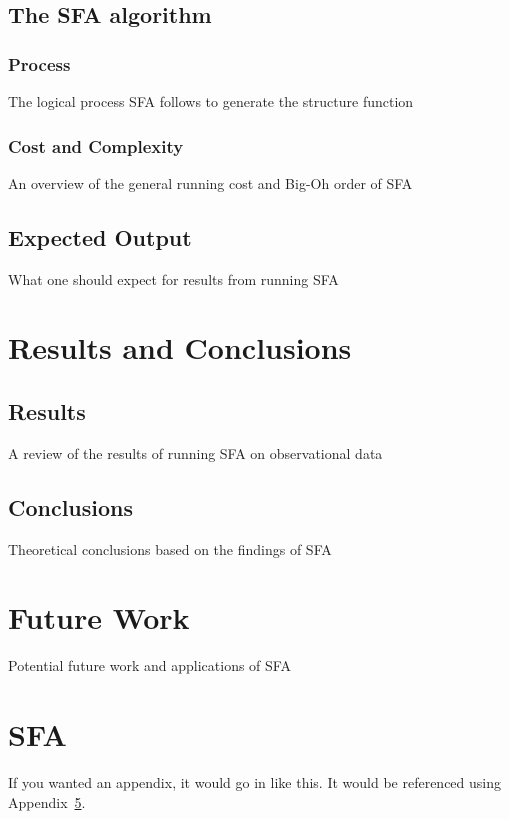 \documentclass[12pt, oneside]{smuthesis}
\begin{document}
\section{\sc The SFA algorithm}

\subsection{\sc Process}

The logical process SFA follows to generate the structure function

\subsection{\sc Cost and Complexity}

An overview of the general running cost and Big-Oh order of SFA

\section{\sc Expected Output}

What one should expect for results from running SFA

\chapter{\sc Results and Conclusions}

\section{\sc Results}

A review of the results of running SFA on observational data

\section{\sc Conclusions}

Theoretical conclusions based on the findings of SFA

\chapter{\sc Future Work}

Potential future work and applications of SFA


\appendix

\chapter{SFA}
\label{app:sfa}
If you wanted an appendix, it would go in like this.  It would be 
referenced using Appendix~\ref{app:sfa}.


\begin{singlespace}

\end{singlespace}
\end{document}
